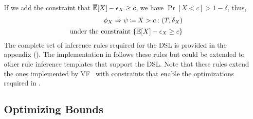If we add the constraint that $\overline{\mathbb{E}}[X] - \epsilon_X \geq c$, we have $\Pr[X < c] > 1 - \delta$, thus, 
\begin{align*}
    \phi_X \Rightarrow \psi \operatorname{\vcentcolon=} X > c: (T, \delta_X) \\
    \text{under the constraint } \{ \overline{\mathbb{E}}[X] - \epsilon_X \geq c\}
\end{align*}
The complete set of inference rules required for the DSL is provided in the appendix ().
The implementation in \AVOIRmethodname{} follows these rules but could be extended to other rule inference templates that support the DSL.
Note that these rules extend the ones implemented by VF~\citep{bastani2019probabilistic} with constraints that enable the optimizations required in \AVOIRmethodname{}. 




\subsection{Optimizing Bounds}
\label{sec:theoretical:optimization}


